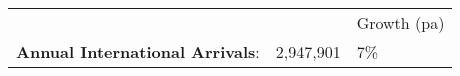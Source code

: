 \begin{tabular}[t]{p{5cm}p{1.3cm}p{1.2cm}}
   &   & Growth (pa) \\ 
 \textbf{Annual International Arrivals}: & 2,947,901 & 7\% \\ 
  \end{tabular}
